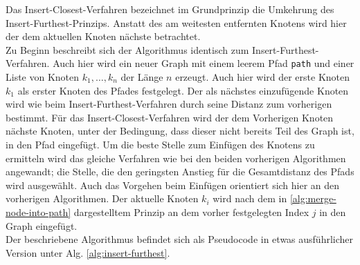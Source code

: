 Das Insert-Closest-Verfahren bezeichnet im Grundprinzip die Umkehrung des Insert-Furthest-Prinzips. 
Anstatt des am weitesten entfernten Knotens wird hier der dem aktuellen Knoten nächste betrachtet.
\\
Zu Beginn beschreibt sich der Algorithmus identisch zum Insert-Furthest-Verfahren.
Auch hier wird ein neuer Graph mit einem leerem Pfad \lstinline{path} und einer Liste von Knoten $k_1, \dots ,k_n$ der Länge $n$ erzeugt.
Auch hier wird der erste Knoten $k_1$ als erster Knoten des Pfades festgelegt.
Der als nächstes einzufügende Knoten wird wie beim Insert-Furthest-Verfahren durch seine Distanz zum vorherigen bestimmt.
Für das Insert-Closest-Verfahren wird der dem Vorherigen Knoten nächste Knoten, unter der Bedingung, dass dieser nicht bereits Teil des Graph ist, in den Pfad eingefügt.
Um die beste Stelle zum Einfügen des Knotens zu ermitteln wird das gleiche Verfahren wie bei den beiden vorherigen Algorithmen angewandt; die Stelle, die den geringsten Anstieg für die Gesamtdistanz des Pfads wird ausgewählt.
Auch das Vorgehen beim Einfügen orientiert sich hier an den vorherigen Algorithmen.
Der aktuelle Knoten $k_i$ wird nach dem in \vref{alg:merge-node-into-path} dargestelltem Prinzip an dem vorher festgelegten Index $j$ in den Graph eingefügt.
\\
Der beschriebene Algorithmus befindet sich als Pseudocode in etwas ausführlicher Version unter \ac{Alg.} \vref{alg:insert-furthest}.
